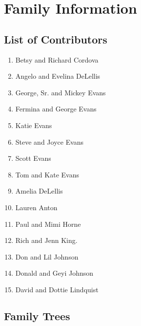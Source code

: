 \documentclass[12pt]{article}
\begin{document}
%
%
%
%
%

\appendix

\titleformat{\section}{\Large\bfseries}{\thesection}{1em}{}

\newpage
\section{Family Information}

\subsection{List of Contributors}

\begin{enumerate}
 \color{red}
 \itemsep0pt
 \parskip1pt
\item Betsy and Richard Cordova %
\item Angelo and Evelina DeLellis
\item George, Sr. and Mickey Evans
\item Fermina and George Evans %
\item Katie Evans
\item Steve and Joyce Evans
\item Scott Evans
\item Tom and Kate Evans %
\item Amelia DeLellis
\item Lauren Anton
\item Paul and Mimi Horne %
\item Rich and Jenn King.
\item Don and Lil Johnson
\item Donald and Geyi Johnson
\item David and Dottie Lindquist
\end{enumerate}

\subsection{Family Trees}
\end{document}
